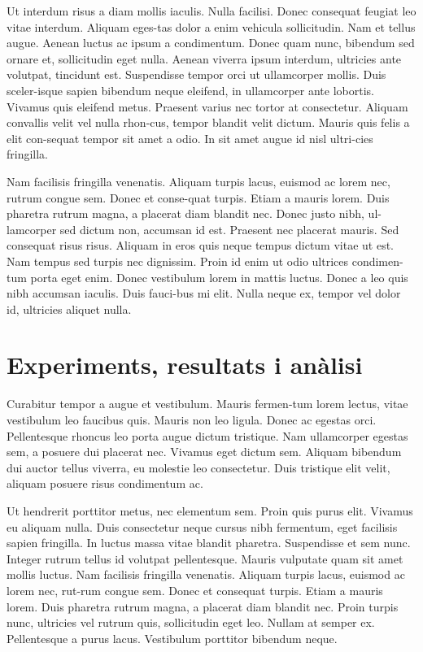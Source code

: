 ﻿\documentclass[10pt,a4paper,twocolumn,twoside]{article}
\begin{document}
Ut interdum risus a diam mollis iaculis. Nulla facilisi. Donec consequat feugiat leo vitae interdum. Aliquam eges-tas dolor a enim vehicula sollicitudin. Nam et tellus augue. Aenean luctus ac ipsum a condimentum. Donec quam nunc, bibendum sed ornare et, sollicitudin eget nulla. Aenean viverra ipsum interdum, ultricies ante volutpat, tincidunt est. Suspendisse tempor orci ut ullamcorper mollis. Duis sceler-isque sapien bibendum neque eleifend, in ullamcorper ante lobortis. Vivamus quis eleifend metus. Praesent varius nec tortor at consectetur. Aliquam convallis velit vel nulla rhon-cus, tempor blandit velit dictum. Mauris quis felis a elit con-sequat tempor sit amet a odio. In sit amet augue id nisl ultri-cies fringilla. 

Nam facilisis fringilla venenatis. Aliquam turpis lacus, euismod ac lorem nec, rutrum congue sem. Donec et conse-quat turpis. Etiam a mauris lorem. Duis pharetra rutrum magna, a placerat diam blandit nec. Donec justo nibh, ul-lamcorper sed dictum non, accumsan id est. Praesent nec placerat mauris. Sed consequat risus risus. Aliquam in eros quis neque tempus dictum vitae ut est. Nam tempus sed turpis nec dignissim. Proin id enim ut odio ultrices condimen-tum porta eget enim. Donec vestibulum lorem in mattis luctus. Donec a leo quis nibh accumsan iaculis. Duis fauci-bus mi elit. Nulla neque ex, tempor vel dolor id, ultricies aliquet nulla.

 
\section{Experiments, resultats i anàlisi}

Curabitur tempor a augue et vestibulum. Mauris fermen-tum lorem lectus, vitae vestibulum leo faucibus quis. Mauris non leo ligula. Donec ac egestas orci. Pellentesque rhoncus leo porta augue dictum tristique. Nam ullamcorper egestas sem, a posuere dui placerat nec. Vivamus eget dictum sem. Aliquam bibendum dui auctor tellus viverra, eu molestie leo consectetur. Duis tristique elit velit, aliquam posuere risus condimentum ac. 

Ut hendrerit porttitor metus, nec elementum sem. Proin quis purus elit. Vivamus eu aliquam nulla. Duis consectetur neque cursus nibh fermentum, eget facilisis sapien fringilla. In luctus massa vitae blandit pharetra. Suspendisse et sem nunc. Integer rutrum tellus id volutpat pellentesque. Mauris vulputate quam sit amet mollis luctus. Nam facilisis fringilla venenatis. Aliquam turpis lacus, euismod ac lorem nec, rut-rum congue sem. Donec et consequat turpis. Etiam a mauris lorem. Duis pharetra rutrum magna, a placerat diam blandit nec. Proin turpis nunc, ultricies vel rutrum quis, sollicitudin eget leo. Nullam at semper ex. Pellentesque a purus lacus. Vestibulum porttitor bibendum neque. 
\end{document}
